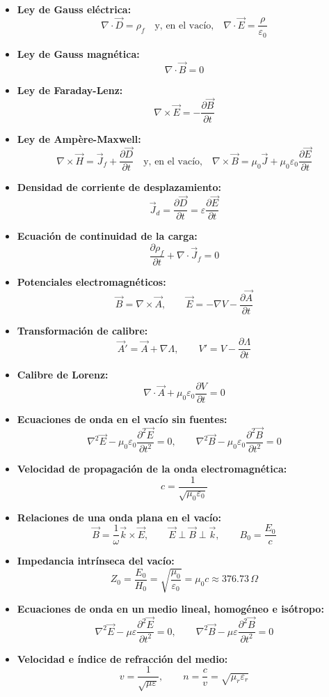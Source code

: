 \documentclass[11pt,a4paper]{article}
\begin{document}
\begin{itemize}
  \item \textbf{Ley de Gauss eléctrica:}
  \[
    \nabla \cdot \vec{D} = \rho_f \quad \text{y, en el vacío,} \quad \nabla \cdot \vec{E} = \frac{\rho}{\varepsilon_0}
  \]
  \item \textbf{Ley de Gauss magnética:}
  \[
    \nabla \cdot \vec{B} = 0
  \]
  \item \textbf{Ley de Faraday-Lenz:}
  \[
    \nabla \times \vec{E} = -\frac{\partial \vec{B}}{\partial t}
  \]
  \item \textbf{Ley de Ampère-Maxwell:}
  \[
    \nabla \times \vec{H} = \vec{J}_f + \frac{\partial \vec{D}}{\partial t} \quad \text{y, en el vacío,} \quad \nabla \times \vec{B} = \mu_0 \vec{J} + \mu_0\varepsilon_0 \frac{\partial \vec{E}}{\partial t}
  \]
  \item \textbf{Densidad de corriente de desplazamiento:}
  \[
    \vec{J}_d = \frac{\partial \vec{D}}{\partial t} = \varepsilon \frac{\partial \vec{E}}{\partial t}
  \]
  \item \textbf{Ecuación de continuidad de la carga:}
  \[
    \frac{\partial \rho_f}{\partial t} + \nabla \cdot \vec{J}_f = 0
  \]
  \item \textbf{Potenciales electromagnéticos:}
  \[
    \vec{B} = \nabla \times \vec{A}, \qquad \vec{E} = -\nabla V - \frac{\partial \vec{A}}{\partial t}
  \]
  \item \textbf{Transformación de calibre:}
  \[
    \vec{A}' = \vec{A} + \nabla \Lambda, \qquad V' = V - \frac{\partial \Lambda}{\partial t}
  \]
  \item \textbf{Calibre de Lorenz:}
  \[
    \nabla \cdot \vec{A} + \mu_0\varepsilon_0 \frac{\partial V}{\partial t} = 0
  \]
  \item \textbf{Ecuaciones de onda en el vacío sin fuentes:}
  \[
    \nabla^2 \vec{E} - \mu_0\varepsilon_0 \frac{\partial^2 \vec{E}}{\partial t^2} = 0, \qquad \nabla^2 \vec{B} - \mu_0\varepsilon_0 \frac{\partial^2 \vec{B}}{\partial t^2} = 0
  \]
  \item \textbf{Velocidad de propagación de la onda electromagnética:}
  \[
    c = \frac{1}{\sqrt{\mu_0\varepsilon_0}}
  \]
  \item \textbf{Relaciones de una onda plana en el vacío:}
  \[
    \vec{B} = \frac{1}{\omega}\vec{k} \times \vec{E}, \qquad \vec{E} \perp \vec{B} \perp \vec{k}, \qquad B_0 = \frac{E_0}{c}
  \]
  \item \textbf{Impedancia intrínseca del vacío:}
  \[
    Z_0 = \frac{E_0}{H_0} = \sqrt{\frac{\mu_0}{\varepsilon_0}} = \mu_0 c \approx 376.73\,\Omega
  \]
  \item \textbf{Ecuaciones de onda en un medio lineal, homogéneo e isótropo:}
  \[
    \nabla^2 \vec{E} - \mu\varepsilon \frac{\partial^2 \vec{E}}{\partial t^2} = 0, \qquad \nabla^2 \vec{B} - \mu\varepsilon \frac{\partial^2 \vec{B}}{\partial t^2} = 0
  \]
  \item \textbf{Velocidad e índice de refracción del medio:}
  \[
    v = \frac{1}{\sqrt{\mu\varepsilon}}, \qquad n = \frac{c}{v} = \sqrt{\mu_r\varepsilon_r}
  \]
\end{itemize}
\end{document}

